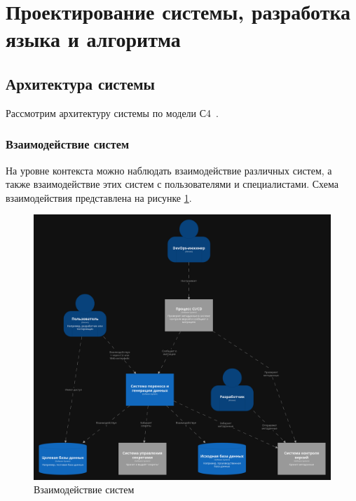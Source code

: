 \section{Проектирование системы, разработка языка и алгоритма}

\subsection{Архитектура системы}

Рассмотрим архитектуру системы по модели С4~\cite{c4-model}.

\subsubsection{Взаимодействие систем}

На уровне контекста можно наблюдать взаимодействие различных систем, а также взаимодействие этих систем с пользователями и специалистами. Схема взаимодействия представлена на рисунке \ref{System Context}.

\begin{figure}
  \includegraphics[scale=0.15]{./img/structurizr-SystemLandscape.png}
  \caption{Взаимодействие систем}
  \label{System Context}
\end{figure}

